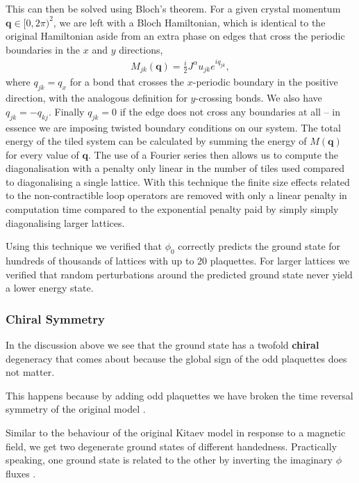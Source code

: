 This can then be solved using Bloch's theorem. For a given crystal momentum \(\textbf{q} \in [0,2\pi)^2\), we are left with a Bloch Hamiltonian, which is identical to the original Hamiltonian aside from an extra phase on edges that cross the periodic boundaries in the \(x\) and \(y\) directions, \[\begin{aligned}
    M_{jk}(\textbf{q}) =  \frac{i}{2} J^{\alpha} u_{jk} e^{i q_{jk}},\end{aligned}\] where \(q_{jk} = q_x\) for a bond that crosses the \(x\)-periodic boundary in the positive direction, with the analogous definition for \(y\)-crossing bonds. We also have \(q_{jk} = -q_{kj}\). Finally \(q_{jk} = 0\) if the edge does not cross any boundaries at all -- in essence we are imposing twisted boundary conditions on our system. The total energy of the tiled system can be calculated by summing the energy of \(M( \textbf{q})\) for every value of \(\textbf{q}\). The use of a Fourier series then allows us to compute the diagonalisation with a penalty only linear in the number of tiles used compared to diagonalising a single lattice. With this technique the finite size effects related to the non-contractible loop operators are removed with only a linear penalty in computation time compared to the exponential penalty paid by simply simply diagonalising larger lattices.

Using this technique we verified that \(\phi_0\) correctly predicts the ground state for hundreds of thousands of lattices with up to 20 plaquettes. For larger lattices we verified that random perturbations around the predicted ground state never yield a lower energy state.

\hypertarget{chiral-symmetry}{%
\subsubsection{Chiral Symmetry}\label{chiral-symmetry}}

In the discussion above we see that the ground state has a twofold \textbf{chiral} degeneracy that comes about because the global sign of the odd plaquettes does not matter.

This happens because by adding odd plaquettes we have broken the time reversal symmetry of the original model \autocite{Chua2011,yaoExactChiralSpin2007,ChuaPRB2011,Fiete2012,Natori2016,Wu2009,Peri2020,WangHaoranPRB2021}.

Similar to the behaviour of the original Kitaev model in response to a magnetic field, we get two degenerate ground states of different handedness. Practically speaking, one ground state is related to the other by inverting the imaginary \(\phi\) fluxes \autocite{yaoExactChiralSpin2007}.

